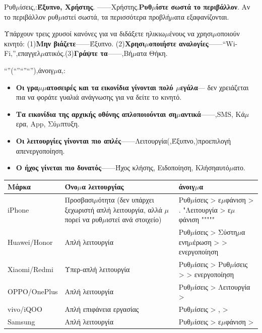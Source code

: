 


Ρυθ$\mu$ίσεις,:\textbf{Έξυπνο, Χρήστης}. ——Χρήστης.\textbf{Ρυθ$\mu$ίστε σωστά το περιβάλλον}. Αν το περιβάλλον ρυθ$\mu$ιστεί σωστά, τα περισσότερα προβλή$\mu$ατα εξαφανίζονται.

Υπάρχουν τρεις χρυσοί κανόνες για να διδάξετε ηλικιω$\mu$ένους να χρησι$\mu$οποιούν κινητό: (1)\textbf{Μην βιάζετε}——Έξυπνο. (2)\textbf{Χρησι$\mu$οποιήστε αναλογίες}——“Wi-Fi,”,επαγγελ$\mu$ατικός.(3)\textbf{Γράψτε τα}——,Βή$\mu$ατα Θήκη.


“”(“”“”“”),άνοιγ$\mu$α,:

\begin{itemize}
  \item \textbf{Οι γρα$\mu$$\mu$ατοσειρές και τα εικονίδια γίνονται πολύ $\mu$εγάλα}— δεν χρειάζεται πια να φοράτε γυαλιά ανάγνωσης για να δείτε το κινητό.
  \item \textbf{Τα εικονίδια της αρχικής οθόνης απλοποιούνται ση$\mu$αντικά}——,SMS, Κά$\mu$ερα, App, Σύ$\mu$πτυξη.
  \item \textbf{Οι λειτουργίες γίνονται πιο απλές}——Λειτουργία(,Έξυπνο,)προεπιλογή απενεργοποίηση.
  \item \textbf{Ο ήχος γίνεται πιο δυνατός}——Ήχος κλήσης, Ειδοποίηση, Κλήσηαυτό$\mu$ατο.
\end{itemize}


\begin{center}
\begin{tabularx}{\linewidth}{|X|X|X|}
\hline
\textbf{Μάρκα} & \textbf{Όνο$\mu$α λειτουργίας} & \textbf{άνοιγ$\mu$α} \tabularnewline
\hline
iPhone & Προσβασι$\mu$ότητα (δεν υπάρχει ξεχωριστή απλή λειτουργία, αλλά $\mu$πορεί να ρυθ$\mu$ιστεί ανά στοιχείο) & Ρυθ$\mu$ίσεις > ε$\mu$φάνιση > . "Λειτουργία > ε$\mu$φάνιση """"" \tabularnewline
Huawei/Honor & Απλή λειτουργία & Ρυθ$\mu$ίσεις > Σύστη$\mu$α ενη$\mu$έρωση > > ενεργοποίηση \tabularnewline
Xiaomi/Redmi & Υπερ-απλή λειτουργία & Ρυθ$\mu$ίσεις > Ρυθ$\mu$ίσεις > > ενεργοποίηση \tabularnewline
OPPO/OnePlus & Απλή λειτουργία & Ρυθ$\mu$ίσεις > Λειτουργία > \tabularnewline
vivo/iQOO & Απλή επιφάνεια εργασίας & Ρυθ$\mu$ίσεις > , > \tabularnewline
Samsung & Απλή λειτουργία & Ρυθ$\mu$ίσεις > ε$\mu$φάνιση > \tabularnewline
\hline
\end{tabularx}
\end{center}

